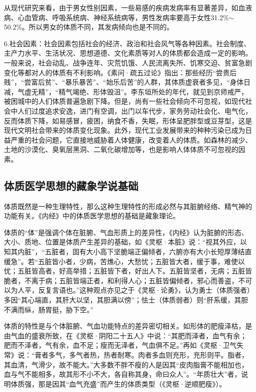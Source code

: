 \documentclass[draft,12pt]{ctexbook}
\begin{document}
从现代研究来看，由于男女性别因素，一些易感的疾病发病率有显著差异，如血液病、心血管病、呼吸系统病、神经系统病等，男性发病率要高于女性31.2\%$\sim$50.2\%。所以男女的体质不同，其发病倾向也是不同的。

6.社会因素：社会因素包括社会的经济、政治和社会风气等各种因素。社会制度、主产力水平、生活状况、思想道德、文化素质等对人的体质都会造成一定的影响。一般来说，社会动乱、战争连年、灾荒饥饿、人民流离失所、饥寒交迫、贫富急剧变化等都对人的体质有不利影响。《素问·疏五过论》指出：那些经历“尝贵后贱”，“尝富后贫”、“暴乐暴苦”、“始乐后苦”的人群，其体质虚衰者多见，“身体日减，气虚无精”，“精气竭绝、形体毁沮”。李东垣所处的年代，就见到京师戒严，被困城中的人们体质普遍急剧下降。但是，尚有一些社会倾向不可忽视，如现代社会中人们过度追求安逸，进门有空调，出门以车代步，家务劳动社会化、电气化，反而体质下降，如易感冒，疲困，纳食不香，失眠，形体呈肥胖型或豆芽型，这是现代文明社会带来的体质变化现象。此外，现代工业发展带来的种种污染已成为日益严重的社会问题，它直接地威胁着人体健康，改变着人的体质。如森林的减少、土地的沙漠化、臭氧层黑洞、二氧化碳增加等，也是影响人体体质不可忽视的因素。

\subsection{体质医学思想的藏象学说基础}%

体质既然是一种生理特性，那么这种生理特性的形成必然与其脏腑经络、精气神的功能有关。《内经》中的体质医学思想的基础是藏象理论。

体质的“体”是强调个体在脏腑、气血形质上的差异性，《内经》认为脏腑的形态、大小、质地、位置是体质产生差异的基础，如《灵枢·本脏》说：“视其外应，以知其内脏”，“五脏者，固有大小高下坚脆端正偏倾者，六腑亦有大小长短厚薄结直缓急”。若“五脏皆小者，少病，苦燋心，大愁忧；五脏皆大者，缓于事，难使以忧；五脏皆高者，好高举措；五脏皆下者，好出人下。五脏皆坚者，无病；五脏皆脆者，不离于病；五脏皆端正者，和利得人心；五脏皆偏倾者，邪心而善盗，不可以为人平，反复言语也。”这种观点亦见之于《灵枢·论勇》，认为勇士（体质强者）多因“其心端直，其肝大以坚，其胆满以傍”；怯士（体质弱者）则“肝系缓，其胆不满而纵，肠胃挺，胁下空。”

体质的特性是与个体脏腑、气血功能特点的差异密切相关。如形体的肥瘦泽枯，是由气血的盛衰所致，在《灵枢·阴阳二十五人》中说：“其肥而泽者，血气有余；肥而不泽者，气有余，血不足；瘦而无泽者，气血俱不足。”再如《灵枢·卫气失常》说：“膏者多气，多气者热，热者耐寒。肉者多血则充形，充形则平。脂者，其血清，气滑少，故不能大。”大多数不胖不瘦的人是因其“皮肉脂膏不能相加也，血与气不能相多，故其形不小不大，各自称其身，命曰众人”。“年质壮大”者，说明体质强，那是因其“血气充盛”而产生的体质类型（《灵枢·逆顺肥瘦》）。
\end{document}
